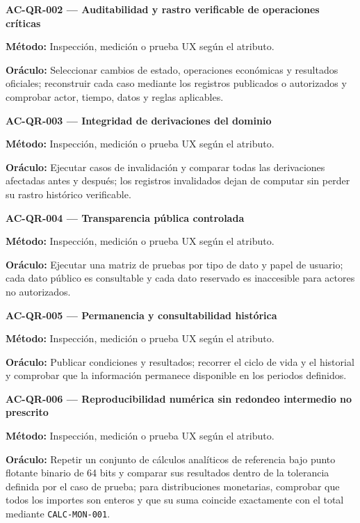 \documentclass[10pt,letterpaper]{article}
\begin{document}
\noindent\textbf{AC-QR-002 --- Auditabilidad y rastro verificable de operaciones críticas}\par
\textbf{Método:} Inspección, medición o prueba UX según el atributo.\par
\textbf{Oráculo:} Seleccionar cambios de estado, operaciones económicas y resultados oficiales; reconstruir cada caso mediante los registros publicados o autorizados y comprobar actor, tiempo, datos y reglas aplicables.\par\vspace{0.45em}
\noindent\textbf{AC-QR-003 --- Integridad de derivaciones del dominio}\par
\textbf{Método:} Inspección, medición o prueba UX según el atributo.\par
\textbf{Oráculo:} Ejecutar casos de invalidación y comparar todas las derivaciones afectadas antes y después; los registros invalidados dejan de computar sin perder su rastro histórico verificable.\par\vspace{0.45em}
\noindent\textbf{AC-QR-004 --- Transparencia pública controlada}\par
\textbf{Método:} Inspección, medición o prueba UX según el atributo.\par
\textbf{Oráculo:} Ejecutar una matriz de pruebas por tipo de dato y papel de usuario; cada dato público es consultable y cada dato reservado es inaccesible para actores no autorizados.\par\vspace{0.45em}
\noindent\textbf{AC-QR-005 --- Permanencia y consultabilidad histórica}\par
\textbf{Método:} Inspección, medición o prueba UX según el atributo.\par
\textbf{Oráculo:} Publicar condiciones y resultados; recorrer el ciclo de vida y el historial y comprobar que la información permanece disponible en los periodos definidos.\par\vspace{0.45em}
\noindent\textbf{AC-QR-006 --- Reproducibilidad numérica sin redondeo intermedio no prescrito}\par
\textbf{Método:} Inspección, medición o prueba UX según el atributo.\par
\textbf{Oráculo:} Repetir un conjunto de cálculos analíticos de referencia bajo punto flotante binario de 64 bits y comparar sus resultados dentro de la tolerancia definida por el caso de prueba; para distribuciones monetarias, comprobar que todos los importes son enteros y que su suma coincide exactamente con el total mediante \texttt{CALC-MON-001}.\par\vspace{0.45em}
\end{document}
